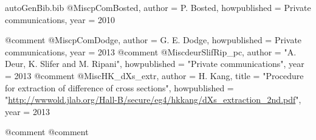 \begin{filecontents*}{autoGenBib.bib}
@Misc{pComBosted,
  author = {P. Bosted},
  howpublished  = {Private communications},
  year = 2010
}

@comment %
@Misc{pComDodge,
  author = {G. E. Dodge},
  howpublished  = {Private communications},
  year = 2013
}
@comment %
@Misc{deurSlifRip_pc,
  author = "{A. Deur, K. Slifer and M. Ripani}",
  howpublished  = "{Private communications}",
  year = 2013
}
@comment %
@Misc{HK_dXs_extr,
  author = {H. Kang},
  title  = "Procedure for extraction of difference of cross sections",
  howpublished = "\url{http://wwwold.jlab.org/Hall-B/secure/eg4/hkkang/dXs\_extraction\_2nd.pdf}", 
  year = 2013
}


@comment %
@comment %


\end{filecontents*}
